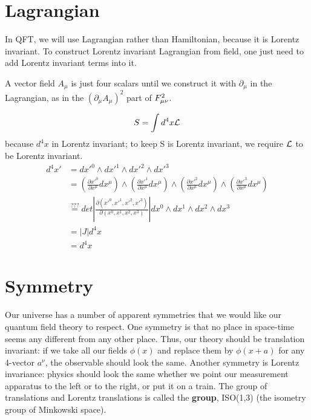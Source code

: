 \section{Lagrangian}
In QFT, we will use Lagrangian rather than Hamiltonian, because it is
Lorentz invariant. To construct Lorentz invariant Lagrangian from field, one
just need to add Lorentz invariant terms into it.

A vector field $A_\mu$ is just four scalars until we construct it with
$\partial_\mu$ in the Lagrangian, as in the $(\partial_{\mu}A_\mu)^2$ part
of $F_{\mu\nu}^2$.

$$ S = \int d^4x\mathcal{L} $$
because $d^4 x$ in Lorentz invariant; to keep S is Lorentz invariant, we require
$\mathcal{L}$ to be Lorentz invariant.
\begin{equation*}
    \begin{aligned}
	d^4x' &= dx'^0 \wedge dx'^1 \wedge dx'^2 \wedge dx'^3	\\
	    &= \left(\frac{\partial x'^0}{\partial x^\mu}dx^\mu\right)
	    \wedge \left(\frac{\partial x'^1}{\partial x^\mu}dx^\mu\right)
	    \wedge \left(\frac{\partial x'^2}{\partial x^\mu}dx^\mu\right)
	    \wedge \left(\frac{\partial x'^3}{\partial x^\mu}dx^\mu\right) \\
	    &\stackrel{???}{=} det\left|\frac{\partial(x'^0, x'^1, x'^2, x'^3)}{\partial(x^0, x^1, x^2, x^3)} \right|
		dx^0 \wedge dx^1 \wedge dx^2 \wedge dx^3    \\
	    &= |J|d^4x	\\
	    &= d^4x
    \end{aligned}
\end{equation*}
\section{Symmetry}
Our universe has a number of apparent symmetries that we would like our
quantum field theory to respect. One symmetry is that no place in space-time
seems any different from any other place. Thus, our theory should be
translation invariant: if we take all our fields $\phi(x)$ and replace them
by $\phi(x+a)$ for any 4-vector $a^\nu$, the observable should look the
same. Another symmetry is Lorentz invariance: physics should look the same
whether we point our measurement apparatus to the left or to the right, or
put it on a train. The group of translations and Lorentz translations is
called the \textbf{\Poincare{} group}, ISO(1,3) (the isometry group of
Minkowski space).

